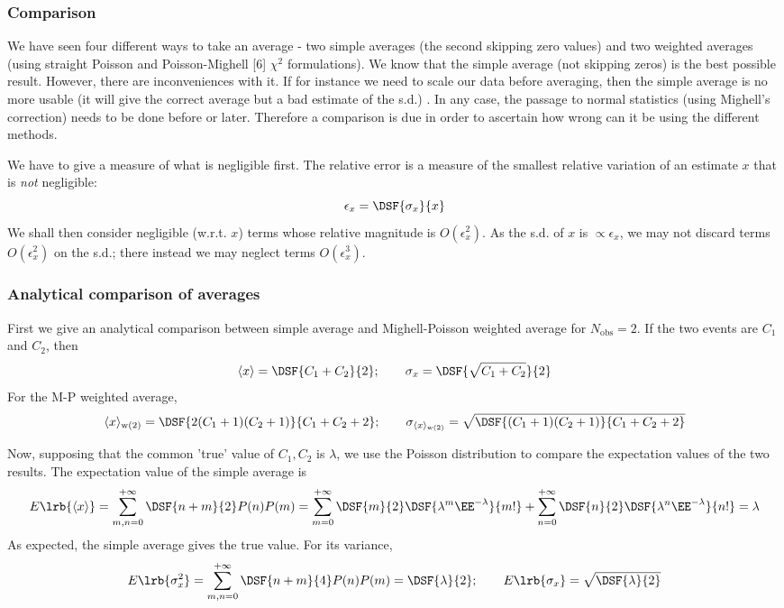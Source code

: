 \subsubsection{Comparison}

We have seen four different ways to take an average -
two simple averages (the second skipping zero values) 
and two weighted averages (using straight Poisson and Poisson-Mighell [6] $\chi^2$ formulations). 
We know that the simple average (not skipping zeros) is the best possible result. However, 
there are inconveniences with it. If for instance we need to scale our data before averaging, then the 
simple average is no more usable (it will give the correct average but a bad estimate of the s.d.) .
In any case, the passage to normal statistics (using Mighell's correction) needs to be done before or later. 
Therefore a comparison is due in order to ascertain 
how wrong can it be using the different methods. 

We have to give a measure of what is negligible first. 
The relative error is a measure of the smallest relative variation of an estimate $x$ that is \emph{not} negligible:
\[
\epsilon_x = \DSF{\sigma_x}{x}
\]
We shall then consider negligible 
(w.r.t. $x$) terms whose relative magnitude is $O(\epsilon_x^2)$.
As the s.d. of $x$ is $\propto\epsilon_x$, we may not discard terms $O(\epsilon_x^2)$ on the s.d.; 
there instead we may neglect terms $O(\epsilon_x^3)$.


\subsubsection{Analytical comparison of averages}

First we give an analytical comparison between simple average and Mighell-Poisson weighted average 
for $N_{\mathrm{obs}}=2$. 
If the two events are $C_1$ and $C_2$, then
\[
\langle x \rangle=\DSF{C_1+C_2}{2}; \qquad \sigma_x=\DSF{\sqrt{C_1+C_2}}{2}
\]
For the M-P weighted average,
\[
\langle x \rangle_{\mathrm{w(2)}}=\DSF{2(C_1+1)(C_2+1)}{C_1+C_2+2}; \qquad 
\sigma_{\langle x \rangle_{\mathrm{w(2)}}}=\sqrt{\DSF{(C_1+1)(C_2+1)}{C_1+C_2+2}}
\]

Now, supposing that the common 'true' value of $C_1,C_2$ is $\lambda$, 
we use the Poisson distribution to compare the expectation values of the two results. The expectation value of the simple average is
\[
E\lrb{\langle x \rangle} = \mathop{\sum}_{m,n=0}^{+\infty}
 \DSF{n+m}{2}P(n)P(m)=\mathop{\sum}_{m=0}^{+\infty}
 \DSF{m}{2}\DSF{\lambda^m\EE^{-\lambda}}{m!}
 +\mathop{\sum}_{n=0}^{+\infty}
 \DSF{n}{2}\DSF{\lambda^n\EE^{-\lambda}}{n!}
 =\lambda
\]
As expected, the simple average gives the true value. 
For its variance, 
\[
E\lrb{\sigma_x^2} = \mathop{\sum}_{m,n=0}^{+\infty}
 \DSF{n+m}{4}P(n)P(m)=\DSF{
 \lambda}{2};\qquad E\lrb{\sigma_x} =\sqrt{\DSF{\lambda}{2}}
\]


